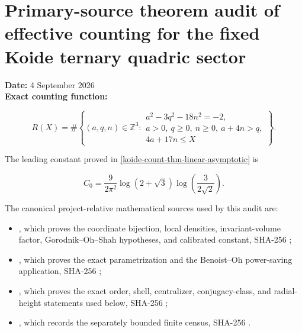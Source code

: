 \section{Primary-source theorem audit of effective counting for the fixed Koide ternary quadric sector}\label{koide-lit-primary-source-theorem-audit-of-effective-counting-for-the-fixed-koide-ternary-quadric-sector}

\textbf{Date:} 4 September 2026\\
\textbf{Exact counting function:}

\[
 R(X)=\#\left\{(a,q,n)\in\mathbb Z^3:
 \begin{array}{l}
 a^2-3q^2-18n^2=-2,\\
 a>0,\ q\geq0,\ n\geq0,\ a+4n>q,\\
 4a+17n\leq X
 \end{array}\right\}.
\]

The leading constant proved in
\cref{koide-count-thm-linear-asymptotic} is

\[
 C_0=\frac{9}{2\pi^2}\log(2+\sqrt3)
       \log\!\left(\frac{3}{2\sqrt2}\right).
\]

The canonical project-relative mathematical sources used by this audit are:

\begin{itemize}
\item
  ,
  which proves the coordinate bijection, local densities, invariant-volume
  factor, Gorodnik--Oh--Shah hypotheses, and calibrated constant, SHA-256
  ;
\item
  ,
  which proves the exact parametrization and the Benoist--Oh power-saving
  application, SHA-256
  ;
\item
  ,
  which proves the exact order, shell, centralizer, conjugacy-class, and
  radial-height statements used below, SHA-256
  ;
\item
  ,
  which records the separately bounded finite census, SHA-256
  .
\end{itemize}

